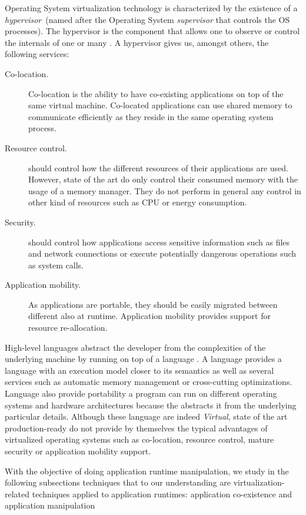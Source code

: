 Operating System virtualization technology is characterized by the existence of a \emph{hypervisor}~(named after the Operating System \emph{supervisor} that controls the OS processes). The hypervisor is the \VM component that allows one to observe or control the internals of one or many \VMs. A \VM hypervisor gives us, amongst others, the following services:

\begin{description}
\item[Co-location.] Co-location is the ability to have co-existing applications on top of the same virtual machine. 
Co-located applications can use shared memory to communicate efficiently as they reside in the same operating system process.

\item[Resource control.] \VMs should control how the different resources of their applications are used. However, state of the art \VMs do only control their consumed memory with the usage of a memory manager. They do not perform in general any control in other kind of resources such as CPU or energy consumption.
\item[Security.] \VMs should control how applications access sensitive information such as files and network connections or execute potentially dangerous operations such as system calls.
\item[Application mobility.] As applications are portable, they should be easily migrated between different \VMs also at runtime. Application mobility provides support for resource re-allocation.
\end{description}

High-level languages abstract the developer from the complexities of the underlying machine by running on top of a language \VM. A language \VM provides a language with an execution model closer to its semantics as well as several services such as automatic memory management or cross-cutting optimizations. Language \VMs also provide portability \ie a program can run on different operating systems and hardware architectures because the \VM abstracts it from the underlying particular details. Although these language \VMs are indeed \emph{Virtual}, state of the art production-ready \VMs do not provide by themselves the typical advantages of virtualized operating systems such as co-location, resource control, mature security or application mobility support.

With the objective of doing application runtime manipulation, we study in the following subsections techniques that to our understanding are virtualization-related techniques applied to application runtimes: application co-existence and application manipulation%

